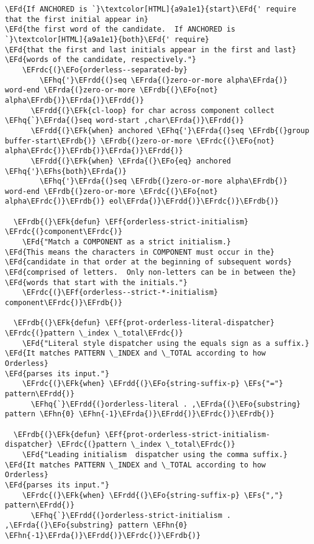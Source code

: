 \documentclass[a4wide,10pt]{article}
\newcommand{\EFs}[1]{\textcolor{EFs}{#1}} %
\newcommand{\EFd}[1]{\textcolor{EFd}{#1}} %
\newcommand{\EFk}[1]{\textcolor{EFk}{#1}} %
\newcommand{\EFf}[1]{\textcolor{EFf}{#1}} %
\newcommand{\EFo}[1]{\textcolor{EFo}{#1}} %
\newcommand{\EFhn}[1]{\textcolor{EFhn}{\textbf{#1}}} %
\newcommand{\EFhq}[1]{\textcolor{EFhq}{#1}} %
\newcommand{\EFhs}[1]{\textcolor{EFhs}{#1}} %
\newcommand{\EFrda}[1]{\textcolor{EFrda}{#1}} %
\newcommand{\EFrdb}[1]{\textcolor{EFrdb}{#1}} %
\newcommand{\EFrdc}[1]{\textcolor{EFrdc}{#1}} %
\newcommand{\EFrdd}[1]{\textcolor{EFrdd}{#1}} %
\begin{document}
\begin{Code}
\begin{Verbatim}
\EFd{If ANCHORED is `}\textcolor[HTML]{a9a1e1}{start}\EFd{' require that the first initial appear in}
\EFd{the first word of the candidate.  If ANCHORED is `}\textcolor[HTML]{a9a1e1}{both}\EFd{' require}
\EFd{that the first and last initials appear in the first and last}
\EFd{words of the candidate, respectively."}
    \EFrdc{(}\EFo{orderless--separated-by}
        \EFhq{'}\EFrdd{(}seq \EFrda{(}zero-or-more alpha\EFrda{)} word-end \EFrda{(}zero-or-more \EFrdb{(}\EFo{not} alpha\EFrdb{)}\EFrda{)}\EFrdd{)}
      \EFrdd{(}\EFk{cl-loop} for char across component collect \EFhq{`}\EFrda{(}seq word-start ,char\EFrda{)}\EFrdd{)}
      \EFrdd{(}\EFk{when} anchored \EFhq{'}\EFrda{(}seq \EFrdb{(}group buffer-start\EFrdb{)} \EFrdb{(}zero-or-more \EFrdc{(}\EFo{not} alpha\EFrdc{)}\EFrdb{)}\EFrda{)}\EFrdd{)}
      \EFrdd{(}\EFk{when} \EFrda{(}\EFo{eq} anchored \EFhq{'}\EFhs{both}\EFrda{)}
        \EFhq{'}\EFrda{(}seq \EFrdb{(}zero-or-more alpha\EFrdb{)} word-end \EFrdb{(}zero-or-more \EFrdc{(}\EFo{not} alpha\EFrdc{)}\EFrdb{)} eol\EFrda{)}\EFrdd{)}\EFrdc{)}\EFrdb{)}

  \EFrdb{(}\EFk{defun} \EFf{orderless-strict-initialism} \EFrdc{(}component\EFrdc{)}
    \EFd{"Match a COMPONENT as a strict initialism.}
\EFd{This means the characters in COMPONENT must occur in the}
\EFd{candidate in that order at the beginning of subsequent words}
\EFd{comprised of letters.  Only non-letters can be in between the}
\EFd{words that start with the initials."}
    \EFrdc{(}\EFf{orderless--strict-*-initialism} component\EFrdc{)}\EFrdb{)}

  \EFrdb{(}\EFk{defun} \EFf{prot-orderless-literal-dispatcher} \EFrdc{(}pattern \_index \_total\EFrdc{)}
    \EFd{"Literal style dispatcher using the equals sign as a suffix.}
\EFd{It matches PATTERN \_INDEX and \_TOTAL according to how Orderless}
\EFd{parses its input."}
    \EFrdc{(}\EFk{when} \EFrdd{(}\EFo{string-suffix-p} \EFs{"="} pattern\EFrdd{)}
      \EFhq{`}\EFrdd{(}orderless-literal . ,\EFrda{(}\EFo{substring} pattern \EFhn{0} \EFhn{-1}\EFrda{)}\EFrdd{)}\EFrdc{)}\EFrdb{)}

  \EFrdb{(}\EFk{defun} \EFf{prot-orderless-strict-initialism-dispatcher} \EFrdc{(}pattern \_index \_total\EFrdc{)}
    \EFd{"Leading initialism  dispatcher using the comma suffix.}
\EFd{It matches PATTERN \_INDEX and \_TOTAL according to how Orderless}
\EFd{parses its input."}
    \EFrdc{(}\EFk{when} \EFrdd{(}\EFo{string-suffix-p} \EFs{","} pattern\EFrdd{)}
      \EFhq{`}\EFrdd{(}orderless-strict-initialism . ,\EFrda{(}\EFo{substring} pattern \EFhn{0} \EFhn{-1}\EFrda{)}\EFrdd{)}\EFrdc{)}\EFrdb{)}


\end{Verbatim}
\end{Code}
\end{document}
